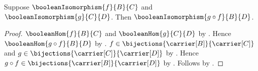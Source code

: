 \begin{theorem}\label{boolean_isomorphism_composition}
    Suppose $\booleanIsomorphism{f}{B}{C}$ and
        $\booleanIsomorphism{g}{C}{D}$.
    Then $\booleanIsomorphism{g\circ f}{B}{D}$.
\end{theorem}
\begin{proof}
    $\booleanHom{f}{B}{C}$ and $\booleanHom{g}{C}{D}$ by
        .
    Hence $\booleanHom{g\circ f}{B}{D}$ by
        .
    $f\in\bijections{\carrier[B]}{\carrier[C]}$ and
        $g\in\bijections{\carrier[C]}{\carrier[D]}$ by
        .
    Hence $g\circ f\in
        \bijections{\carrier[B]}{\carrier[D]}$ by
        .
    Follows by .
\end{proof}

